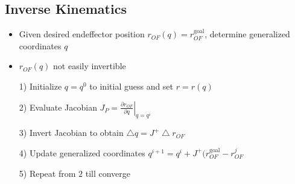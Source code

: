 \subsection{Inverse Kinematics}
\begin{itemize}
    \item Given desired endeffector position $r_{OF}(q) = r^{\text{goal}}_{OF}$, determine generalized coordinates $q$
    \item $r_{OF}(q)$ not easily invertible
\end{itemize}
\begin{minipage}[b]{0.6\linewidth}
    \begin{itemize}
            \begin{itemize}
                \item[1)] Initialize $q = q^0$ to initial guess and set $r = r(q)$
                \item[2)] Evaluate Jacobian $J_P = \left.\frac{\partial r_{OF}}{\partial q} \right|_{q = q^i}$
                \item[3)] Invert Jacobian to obtain $\bigtriangleup q = J^+ \bigtriangleup r_{OF}$
                \item[4)] Update generalized coordinates $q^{i+1} = q^i + J^+(r^\text{goal}_{OF} - r^j_{OF}$
                \item[5)] Repeat from $2$ till converge
            \end{itemize}
    \end{itemize}
\end{minipage}
